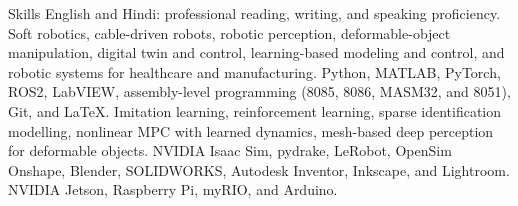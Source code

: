 
\begin{rubric}{Skills}
	\entry*[Languages]
		English and Hindi: professional reading, writing, and speaking proficiency.
		Soft robotics, cable-driven robots, robotic perception, deformable-object manipulation, digital twin and control, learning-based modeling and control, and robotic systems for healthcare and manufacturing.
	\entry*[Programming]
		Python, MATLAB, PyTorch, ROS2, LabVIEW, assembly-level programming (8085, 8086, MASM32, and 8051), Git, and LaTeX.
		Imitation learning, reinforcement learning, sparse identification modelling, nonlinear MPC with learned dynamics, mesh-based deep perception for deformable objects.
	\entry*[Simulation] NVIDIA Isaac Sim, pydrake, LeRobot, OpenSim 
		Onshape, Blender, SOLIDWORKS, Autodesk Inventor, Inkscape, and Lightroom.
	\entry*[Hardware]
		NVIDIA Jetson, Raspberry Pi, myRIO, and Arduino.
	\end{rubric}
	